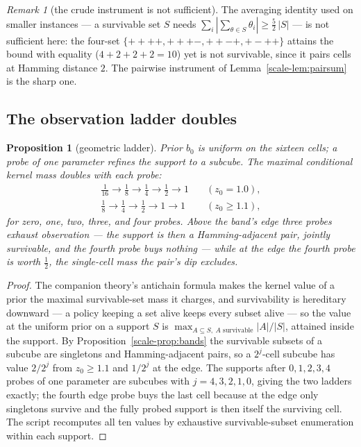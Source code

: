 \documentclass[10pt,twocolumn]{article}
\theoremstyle{plain}
\newtheorem{proposition}[theorem]{Proposition}
\theoremstyle{definition}
\theoremstyle{remark}
\newtheorem{remark}[theorem]{Remark}
\begin{document}
\begin{remark}[the crude instrument is not sufficient]
\label{scale-rem:crude}
The averaging identity used on smaller instances --- a survivable set
\(S\) needs \(\sum_{i} |\sum_{\theta \in S} \theta_{i}| \ge
\tfrac52\,|S|\) --- is not sufficient here: the four-set
\(\{++++, +++-, ++-+, +-++\}\) attains the bound with equality
(\(4 + 2 + 2 + 2 = 10\)) yet is not survivable, since it pairs cells
at Hamming distance \(2\). The pairwise instrument of
Lemma~\ref{scale-lem:pairsum} is the sharp one.
\end{remark}

\subsection{The observation ladder doubles}\label{scale-ladder}

\begin{proposition}[geometric ladder]\label{scale-prop:ladder}
Prior \(b_{0}\) is uniform on the sixteen cells; a probe of one
parameter refines the support to a subcube. The maximal conditional
kernel mass doubles with each probe:
\begin{align*}
\tfrac1{16} \to \tfrac18 \to \tfrac14 \to \tfrac12 \to 1
&\quad (z_{0} = 1.0),\\
\tfrac18 \to \tfrac14 \to \tfrac12 \to 1 \to 1
&\quad (z_{0} \ge 1.1),
\end{align*}
for zero, one, two, three, and four probes. Above the band's edge
three probes exhaust observation --- the support is then a
Hamming-adjacent pair, jointly survivable, and the fourth probe buys
nothing --- while at the edge the fourth probe is worth
\(\tfrac12\), the single-cell mass the pair's dip excludes.
\end{proposition}

\begin{proof}
The companion theory's antichain formula makes the kernel value of a
prior the maximal survivable-set mass it charges, and survivability is
hereditary downward --- a policy keeping a set alive keeps every
subset alive --- so the value at the uniform prior on a support
\(S\) is \(\max_{A \subseteq S,\ A
\text{ survivable}} |A|/|S|\), attained inside the support. By
Proposition~\ref{scale-prop:bands} the survivable subsets of a subcube are
singletons and Hamming-adjacent pairs, so a \(2^{j}\)-cell subcube
has value \(2/2^{j}\) from \(z_{0} \ge 1.1\) and \(1/2^{j}\) at
the edge. The supports after \(0, 1, 2, 3, 4\) probes of one
parameter are subcubes with \(j = 4, 3, 2, 1, 0\), giving the two
ladders exactly; the fourth edge probe buys the last cell because at
the edge only singletons survive and the fully probed support is then
itself the surviving cell. The script recomputes all ten values by
exhaustive survivable-subset enumeration within each support.
\end{proof}
\end{document}
